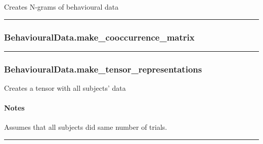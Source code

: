 Creates N-grams of behavioural data

\begin{center}\rule{0.5\linewidth}{\linethickness}\end{center}

\hypertarget{behaviouraldata.make_cooccurrence_matrix}{%
\subsubsection{BehaviouralData.make\_cooccurrence\_matrix}\label{behaviouraldata.make_cooccurrence_matrix}}

\begin{Shaded}
\begin{Highlighting}[]
\OperatorTok{=<} \OperatorTok{>}\NormalTok{)}
\end{Highlighting}
\end{Shaded}

\begin{center}\rule{0.5\linewidth}{\linethickness}\end{center}

\hypertarget{behaviouraldata.make_tensor_representations}{%
\subsubsection{BehaviouralData.make\_tensor\_representations}\label{behaviouraldata.make_tensor_representations}}

\begin{Shaded}
\begin{Highlighting}[]
\NormalTok{)}
\end{Highlighting}
\end{Shaded}

Creates a tensor with all subjects' data

\hypertarget{notes}{%
\paragraph{Notes}\label{notes}}

Assumes that all subjects did same number of trials.

\begin{center}\rule{0.5\linewidth}{\linethickness}\end{center}

